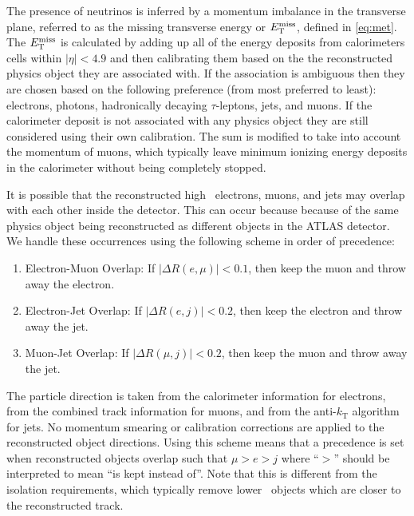 The presence of neutrinos is inferred by a momentum
imbalance in the transverse plane, referred to as the missing
transverse energy or $E_{\mathrm{T}}^{\mathrm{miss}}$, defined in \eqn\eqref{eq:met}. 
The $E_{\mathrm{T}}^{\mathrm{miss}}$ is calculated by 
adding up all of 
the energy deposits from calorimeters cells within $|\eta| < 4.9$
and then calibrating them based on the the reconstructed
physics object they are associated with.
If the association is ambiguous then they are chosen based on the following
preference (from most preferred to least): electrons, photons, 
hadronically decaying $\tau$-leptons, jets, and muons.
If the calorimeter deposit is not associated with any physics object
they are still considered using their own calibration.
The sum is modified to take into account the momentum of muons,
which typically leave minimum ionizing energy deposits
in the calorimeter without being completely stopped.



It is possible that the reconstructed high \pt~electrons, muons, and jets
may overlap with each other inside the detector.  This can occur
because because of the same physics object being reconstructed as different
objects in the ATLAS detector.  
We handle these occurrences using the following
scheme in order of precedence:
\begin{enumerate}
	\item Electron-Muon Overlap: If $|\Delta R(e,\mu)| < 0.1$, 
	then keep the muon and throw away the electron.
	\item Electron-Jet Overlap: If $|\Delta R(e,j)| < 0.2$, 
	then keep the electron and throw away the jet.
	\item Muon-Jet Overlap: If $|\Delta R(\mu,j)| < 0.2$, 
	then keep the muon and throw away the jet.
\end{enumerate}
The particle direction is taken from the calorimeter information for electrons,
from the combined track information for muons, and from the anti-$k_{\mathrm{T}}$
algorithm for jets.
No momentum smearing or calibration corrections
are applied to the reconstructed object directions. 
Using this scheme means that a precedence is set when 
reconstructed objects overlap such that $\mu > e > j$ where ``$>$'' should
be interpreted to mean ``is kept instead of''. 
Note that this is different from the isolation requirements, which
typically remove lower \pt~objects which are closer to the reconstructed
track.



